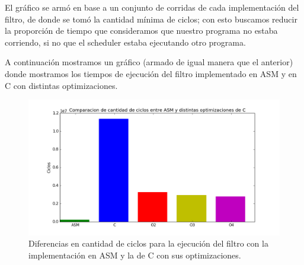 	El gráfico se armó en base a un conjunto de corridas de cada implementación del filtro, de donde se tomó la cantidad mínima de ciclos; con esto buscamos reducir la proporción de tiempo que consideramos que nuestro programa no estaba corriendo, si no que el scheduler estaba ejecutando otro programa.
	
	A continuación mostramos un gráfico (armado de igual manera que el anterior) donde mostramos los tiempos de ejecución del filtro implementado en ASM y en C con distintas optimizaciones.
	
\begin{figure}[h!]
\centering
\includegraphics[width = 15 cm, height = 8 cm]{imagenes/rotarConC.png}
\caption[center]{Diferencias en cantidad de ciclos para la ejecución del filtro con la implementación en ASM y la de C con sus optimizaciones.}
\end{figure}